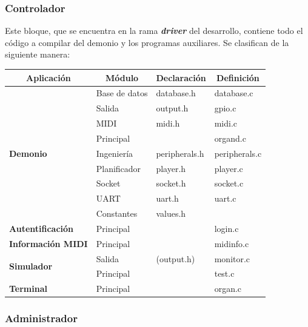 \subsubsection{Controlador}

Este bloque, que se encuentra en la rama \textbf{\textit{driver}} del desarrollo, contiene todo el código a compilar del demonio y los programas auxiliares. Se clasifican de la siguiente manera:

\smallskip

\begin{center}
	\begin{tabular}{|l|l|l|l|}
		\hline \multicolumn{1}{|c|}{\textbf{Aplicación}} & \multicolumn{1}{c|}{\textbf{Módulo}} & \multicolumn{1}{c|}{\textbf{Declaración}} & \multicolumn{1}{c|}{\textbf{Definición}} \\ 
		\hline \multirow{9}{*}{\textbf{Demonio}} & Base de datos & database.h & database.c \\
		\cline{2-4} & Salida & output.h & gpio.c \\
		\cline{2-4} & MIDI & midi.h & midi.c \\
		\cline{2-4} & Principal & & organd.c \\
		\cline{2-4} & Ingeniería & peripherals.h & peripherals.c \\
		\cline{2-4} & Planificador & player.h & player.c \\
		\cline{2-4} & Socket & socket.h & socket.c \\
		\cline{2-4} & UART & uart.h & uart.c \\
		\cline{2-4} & Constantes & values.h & \\
		\hline \textbf{Autentificación} & Principal & & login.c \\
		\hline \textbf{Información MIDI} & Principal & & midinfo.c \\
		\hline \multirow{2}{*}{\textbf{Simulador}} & Salida & (output.h) & monitor.c \\
		\cline{2-4} & Principal & & test.c \\
		\hline \textbf{Terminal} & Principal & & organ.c \\
		\hline 
	\end{tabular}
	\smallskip
\end{center}

\smallskip

\subsubsection{Administrador}

